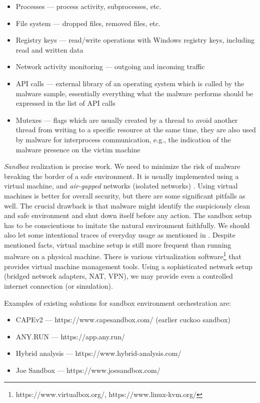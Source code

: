 \begin{itemize}
  \itemsep0em 
  \item Processes --- process activity, subprocesses, etc.
  \item File system --- dropped files, removed files, etc.
  \item Registry keys --- read/write operations with Windows registry keys, including read and written data
  \item Network activity monitoring --- outgoing and incoming traffic
  \item API calls --- external library of an operating system which is called by the malware sample, essentially everything what the malware performs should be expressed in the list of API calls
  \item Mutexes --- flags which are usually created by a thread to avoid another thread from writing to a specific resource at the same time, they are also used by malware for interprocess communication, e.g., the indication of the malware presence on the victim machine
\end{itemize}

\emph{Sandbox} realization is precise work. We need to minimize the risk of malware breaking the border of a safe environment. It is usually implemented using a virtual machine, and \emph{air-gapped} networks (isolated networks) \cite{Sikorski2012}. Using virtual machines is better for overall security, but there are some significant pitfalls as well. The crucial drawback is that malware might identify the suspiciously clean and safe environment and shut down itself before any action. The sandbox setup has to be conscientious to imitate the natural environment faithfully. We should also let some intentional traces of everyday usage as mentioned in \cite{CAPESand75:online}. Despite mentioned facts, virtual machine setup is still more frequent than running malware on a physical machine. There is various virtualization software\footnote{https://www.virtualbox.org/, https://www.linux-kvm.org/} that provides virtual machine management tools. Using a sophisticated network setup (bridged network adapters, NAT, VPN), we may provide even a controlled internet connection (or simulation).

Examples of existing solutions for sandbox environment orchestration are:
\begin{itemize}
  \itemsep0em 
  \item CAPEv2 --- https://www.capesandbox.com/ (earlier cuckoo sandbox)
  \item ANY.RUN --- https://app.any.run/
  \item Hybrid analysis --- https://www.hybrid-analysis.com/
  \item Joe Sandbox --- https://www.joesandbox.com/
\end{itemize}

